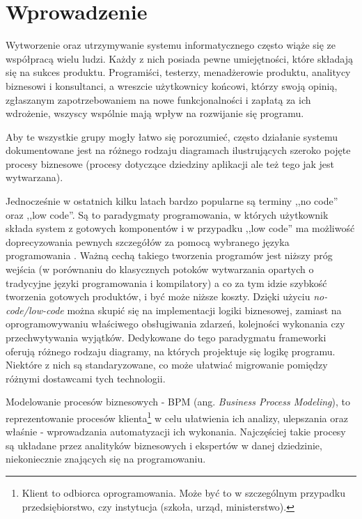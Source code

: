 \documentclass[declaration,shortabstract,mgr]{iithesis}
\author         {Bartłomiej Grochowski}
\date          {}                     %
\begin{document}

\chapter{Wprowadzenie}
Wytworzenie oraz utrzymywanie systemu informatycznego często wiąże się ze współpracą wielu ludzi. Każdy z nich posiada pewne umiejętności, które składają się na sukces produktu. Programiści, testerzy, menadżerowie produktu, analitycy biznesowi i konsultanci, a wreszcie użytkownicy końcowi, którzy swoją opinią, zgłaszanym zapotrzebowaniem na nowe funkcjonalności i zapłatą za ich wdrożenie, 
wszyscy wspólnie mają wpływ na rozwijanie się programu. 

Aby te wszystkie grupy mogły łatwo się porozumieć, często działanie systemu dokumentowane jest na różnego rodzaju diagramach ilustrujących 
szeroko pojęte procesy biznesowe (procesy dotyczące dziedziny aplikacji
ale też tego jak jest wytwarzana).

Jednocześnie w ostatnich kilku latach bardzo popularne są terminy ,,no code'' oraz ,,low code''. Są to paradygmaty programowania, w których użytkownik składa system z gotowych komponentów i w przypadku ,,low code'' ma możliwość doprecyzowania pewnych szczegółów za pomocą wybranego języka programowania \cite{lowcode-nocode}. Ważną cechą takiego tworzenia programów jest niższy próg wejścia (w porównaniu
do klasycznych potoków wytwarzania opartych o tradycyjne języki
programowania i 
kompilatory) a co za tym idzie szybkość tworzenia gotowych produktów, i być może niższe koszty. Dzięki użyciu \textit{no-code/low-code} można skupić się na implementacji logiki biznesowej, zamiast na oprogramowywaniu właściwego obsługiwania zdarzeń, kolejności wykonania czy przechwytywania wyjątków. Dedykowane do tego paradygmatu frameworki oferują różnego rodzaju diagramy, na których projektuje się logikę programu. Niektóre z nich są standaryzowane, co może ułatwiać migrowanie pomiędzy różnymi dostawcami tych technologii.

Modelowanie procesów biznesowych - BPM (ang. \textit{Business Process Modeling}), to reprezentowanie procesów klienta\footnote{Klient to odbiorca oprogramowania. Może być to w szczególnym przypadku przedsiębiorstwo, czy instytucja (szkoła, urząd, ministerstwo).} w celu ułatwienia ich analizy, ulepszania oraz właśnie - wprowadzania automatyzacji \cite{bpm-wiki} ich wykonania. Najczęściej takie procesy są układane przez analityków biznesowych i ekspertów w danej dziedzinie, niekoniecznie znających się na programowaniu. 
\end{document}
